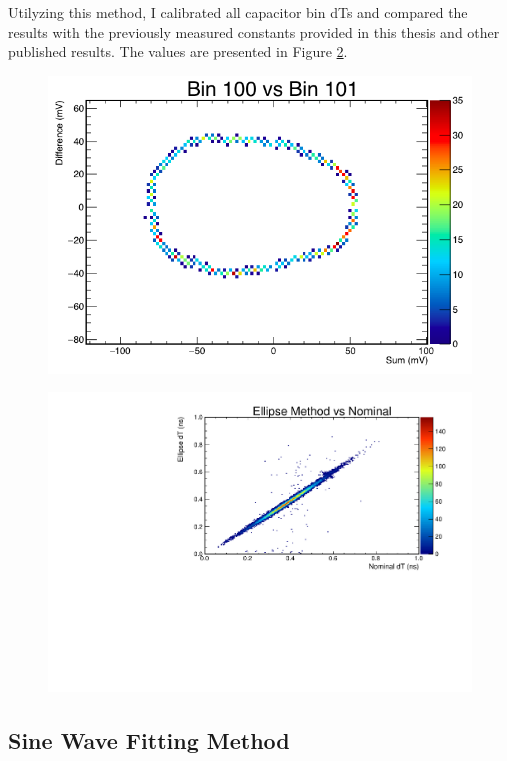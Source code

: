 		Utilyzing this method, I calibrated all capacitor bin dTs and compared the results with the previously measured constants provided in this thesis and other published results\cite{benSThesis}.  The values are presented in Figure \ref{fig:ellipseResults}.
		
	\begin{figure}
		\includegraphics[width=\textwidth]{figures/ellipseMethodExample}
		\caption{}
		\label{fig:ellipseMethodExample}
	\end{figure}

	\begin{figure}
		\includegraphics[width=\textwidth]{figures/ellipseComparison}
		\caption{}
		\label{fig:ellipseResults}
	\end{figure}


	\subsection{Sine Wave Fitting Method}
	
